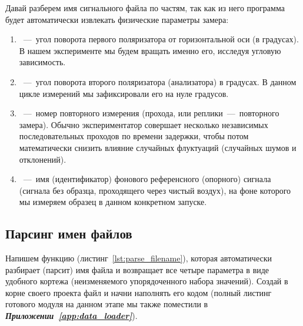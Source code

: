 Давай разберем имя сигнального файла по частям, так как из него программа будет автоматически извлекать физические параметры замера:
\begin{enumerate}
    \item {}~---~угол поворота первого поляризатора от горизонтальной оси (в градусах). В нашем эксперименте мы будем вращать именно его, исследуя угловую зависимость.
    \item {}~---~угол поворота второго поляризатора (анализатора) в градусах. В данном цикле измерений мы зафиксировали его на нуле градусов.
    \item {}~---~номер повторного измерения (прохода, или реплики~---~повторного замера). Обычно экспериментатор совершает несколько независимых последовательных проходов по времени задержки, чтобы потом математически снизить влияние случайных флуктуаций (случайных шумов и отклонений).
    \item {}~---~имя (идентификатор) фонового референсного (опорного) сигнала (сигнала без образца, проходящего через чистый воздух), на фоне которого мы измеряем образец в данном конкретном запуске.
\end{enumerate}

\subsection{Парсинг имен файлов}

Напишем функцию  (листинг~\ref{lst:parse_filename}), которая автоматически разбирает (парсит) имя файла и возвращает все четыре параметра в виде удобного кортежа (неизменяемого упорядоченного набора значений). Создай в корне своего проекта файл  и начни наполнять его кодом (полный листинг готового модуля на данном этапе мы также поместили в \textbf{\textit{Приложении~\ref{app:data_loader}}}).

